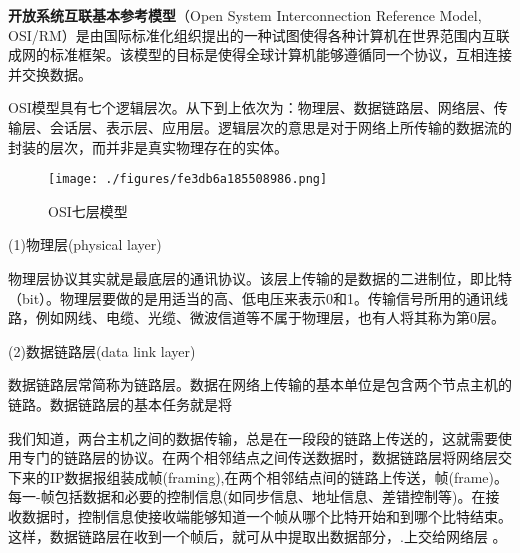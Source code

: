 
\textbf{开放系统互联基本参考模型}（Open System Interconnection Reference Model, OSI/RM）是由国际标准化组织提出的一种试图使得各种计算机在世界范围内互联成网的标准框架。该模型的目标是使得全球计算机能够遵循同一个协议，互相连接并交换数据。

OSI模型具有七个逻辑层次。从下到上依次为：物理层、数据链路层、网络层、传输层、会话层、表示层、应用层。逻辑层次的意思是对于网络上所传输的数据流的封装的层次，而并非是真实物理存在的实体。
\begin{figure}[ht]
\centering
\texttt{[image: ./figures/fe3db6a185508986.png]}
\caption{OSI七层模型} \label{fig_OSIRM_1}
\end{figure}

(1)物理层(physical layer)

物理层协议其实就是最底层的通讯协议。该层上传输的是数据的二进制位，即比特（bit）。物理层要做的是用适当的高、低电压来表示0和1。传输信号所用的通讯线路，例如网线、电缆、光缆、微波信道等不属于物理层，也有人将其称为第0层。

(2)数据链路层(data link layer)

数据链路层常简称为链路层。数据在网络上传输的基本单位是包含两个节点主机的链路。数据链路层的基本任务就是将

我们知道，两台主机之间的数据传输，总是在一段段的链路上传送的，这就需要使用专门的链路层的协议。在两个相邻结点之间传送数据时，数据链路层将网络层交下来的IP数据报组装成帧(framing),在两个相邻结点间的链路上传送，帧(frame)。每一-帧包括数据和必要的控制信息(如同步信息、地址信息、差错控制等)。在接收数据时，控制信息使接收端能够知道一个帧从哪个比特开始和到哪个比特结束。这样，数据链路层在收到一个帧后，就可从中提取出数据部分，.上交给网络层 。